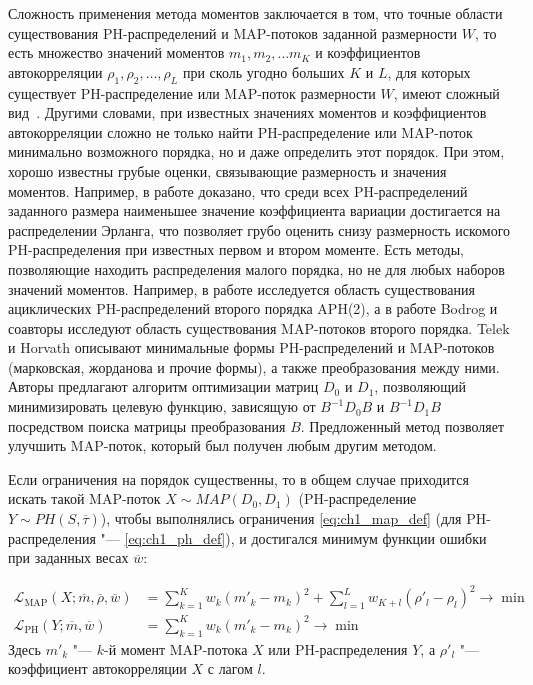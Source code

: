 Сложность применения метода моментов заключается в том, что точные области существования PH-распределений и MAP-потоков заданной размерности $W$, то есть множество значений моментов $m_1, m_2, \dots m_K$ и коэффициентов автокорреляции $\rho_1, \rho_2, \dots, \rho_L$ при сколь угодно больших $K$ и $L$, для которых существует PH-распределение или MAP-поток размерности $W$, имеют сложный вид~\cite{Bobbio2005,Osogami2006,TelekHorvath2007,Bodrog2008,Bodrog2010}. Другими словами, при известных значениях моментов и коэффициентов автокорреляции сложно не только найти PH-распределение или MAP-поток минимально возможного порядка, но и даже определить этот порядок. При этом, хорошо известны грубые оценки, связывающие размерность и значения моментов. Например, в работе \cite{Aldous1987} доказано, что среди всех PH-распределений заданного размера наименьшее значение коэффициента вариации достигается на распределении Эрланга, что позволяет грубо оценить снизу размерность искомого PH-распределения при известных первом и втором моменте. Есть методы, позволяющие находить распределения малого порядка, но не для любых наборов значений моментов. Например, в работе \cite{Telek2003} исследуется область существования ациклических PH-распределений второго порядка APH(2), а в работе \cite{Bodrog2010} Bodrog и соавторы исследуют область существования MAP-потоков второго порядка. Telek и Horvath \cite{TelekHorvath2007} описывают минимальные формы PH-распределений и MAP-потоков (марковская, жорданова и прочие формы), а также преобразования между ними. Авторы предлагают алгоритм оптимизации матриц $D_0$ и $D_1$, позволяющий минимизировать целевую функцию, зависящую от $B^{-1}D_{0}B$ и $B^{-1}D_{1}B$ посредством поиска матрицы преобразования $B$. Предложенный метод позволяет улучшить MAP-поток, который был получен любым другим методом.

Если ограничения на порядок существенны, то в общем случае приходится искать такой MAP-поток $X \sim MAP(D_0, D_1)$ (PH-распределение $Y \sim PH(S, \overline{\tau})$), чтобы выполнялись ограничения \eqref{eq:ch1_map_def} (для PH-распределения "--- \eqref{eq:ch1_ph_def}), и достигался минимум функции ошибки при заданных весах $\overline{w}$:

$$
\begin{aligned}
\mathcal{L}_{\text{MAP}}(X; \overline{m}, \overline{\rho}, \overline{w}) &=
\sum\limits_{k=1}^K w_k (m'_k - m_k)^2 + \sum\limits_{l=1}^L w_{K+l} (\rho'_l - \rho_l)^2 \rightarrow \min\\
\mathcal{L}_{\text{PH}}(Y; \overline{m}, \overline{w}) &=
\sum\limits_{k=1}^K w_k (m'_k - m_k)^2 \rightarrow \min
\end{aligned}
$$
Здесь $m'_k$ "--- $k$-й момент MAP-потока $X$ или PH-распределения $Y$, а $\rho'_l$ "--- коэффициент автокорреляции $X$ с лагом $l$.

